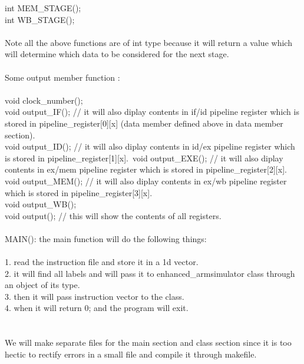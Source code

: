 \documentclass{scrreprt}
\begin{document}
\indent                     int MEM_STAGE();\\
\indent                     int WB_STAGE();\\
\\
Note all the above functions are of int type because it will return a value which will determine which data to be considered for the next stage.\\
\\
Some output member function :
\\
\\
\indent void clock_number();\\
\indent void output_IF();  // it will also diplay contents in if/id pipeline register which is stored in pipeline_register[0][x] (data member defined above in data member section). \\
\indent void output_ID();  // it will also diplay contents in id/ex pipeline register which is stored in pipeline_register[1][x].\
\indent void output_EXE(); // it will also diplay contents in ex/mem pipeline register which is stored in pipeline_register[2][x].\\
\indent void output_MEM(); // it will also diplay contents in ex/wb pipeline register which is stored in pipeline_register[3][x].\\
\indent void output_WB();\\
\indent void output(); // this will show the contents of all registers.
\\
\\
MAIN(): the main function will do the following things:\\
\\
       1. read the instruction file and store it in a 1d vector.\\
       2. it will find all labels and will pass it to enhanced_armsimulator class through an object of its type.\\
       3. then it will pass instruction vector to the class.\\
       4. when it will return 0; and the program will exit.\\
\\
\\
       We will make separate files for the main section and class section since it is too hectic to rectify errors in a small file and compile it through makefile.
\\
\\
$ $
\end{document}
